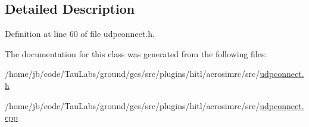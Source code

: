 \subsection{\-Detailed \-Description}


\-Definition at line 60 of file udpconnect.\-h.



\-The documentation for this class was generated from the following files\-:\begin{DoxyCompactItemize}
\item 
/home/jb/code/\-Tau\-Labs/ground/gcs/src/plugins/hitl/aerosimrc/src/\hyperlink{udpconnect_8h}{udpconnect.\-h}\item 
/home/jb/code/\-Tau\-Labs/ground/gcs/src/plugins/hitl/aerosimrc/src/\hyperlink{udpconnect_8cpp}{udpconnect.\-cpp}\end{DoxyCompactItemize}

